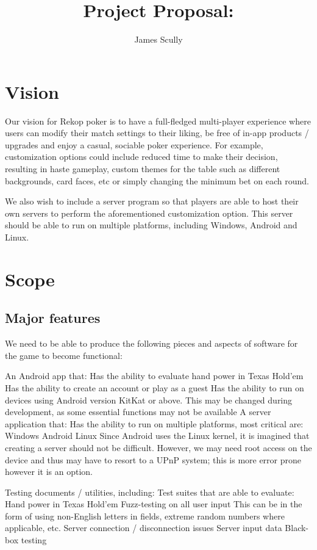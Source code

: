 \documentclass[11pt]{article}
\title{Project Proposal: \pt}
\author{James Scully}
\begin{document}
\section*{Vision}
Our vision for Rekop poker is to have a full-fledged multi-player experience where users can modify their match settings to their liking, be free of in-app products / upgrades and enjoy a casual, sociable poker experience. For example, customization options could include reduced time to make their decision, resulting in haste gameplay, custom themes for the table such as different backgrounds, card faces, etc or simply changing the minimum bet on each round. 

We also wish to include a server program so that players are able to host their own servers to perform the aforementioned customization option. This server should be able to run on multiple platforms, including Windows, Android and Linux. 



\section*{Scope}

\subsection*{Major features}


We need to be able to produce the following pieces and aspects of software for the game to become functional:
	\begin{outline}
		\1 An Android app that:
			\2 Has the ability to evaluate hand power in Texas Hold'em
			\2 Has the ability to create an account or play as a guest
			\2 Has the ability to run on devices using Android version KitKat or above.
				\3 This may be changed during development, as some essential functions may not be available
		\1 A server application that:
			\2 Has the ability to run on multiple platforms, most critical are: 
				\3 Windows
				\3 Android
				\3 Linux
				\3 Since Android uses the Linux kernel, it is imagined that creating a server should not be difficult. However, we may need root access on the device and thus may have to resort to a UPnP system; this is more error prone however it is an option.
				
		\1 Testing documents / utilities, including:
			\2 Test suites that are able to evaluate:
				\3 Hand power in Texas Hold'em
				\3 Fuzz-testing on all user input
					\4 This can be in the form of using non-English letters in fields, extreme random numbers where applicable, etc.
				\3 Server connection / disconnection issues
				\3 Server input data
			\2 Black-box testing
				\3 
								
			 
	\end{outline}
\end{document}
